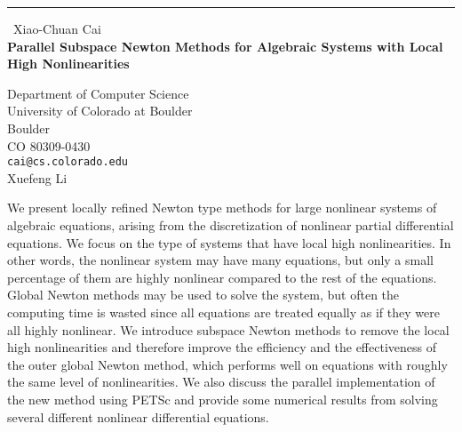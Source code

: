 \documentclass{report}
\begin{document}
\begin{center}
\rule{6in}{1pt} \
{\large Xiao-Chuan Cai \\
{\bf Parallel Subspace Newton Methods for Algebraic Systems with Local High Nonlinearities}}

Department of Computer Science \\ University of Colorado at Boulder \\ Boulder \\ CO 80309-0430
\\
{\tt cai@cs.colorado.edu}\\
Xuefeng Li\end{center}

We present locally refined Newton type methods for
large nonlinear systems of algebraic equations, arising from the
discretization of nonlinear partial differential equations. We focus on
the type of systems that have local high
nonlinearities. In other words, the nonlinear system may have many
equations, but only a small percentage of them are highly nonlinear
compared to the rest of the equations. Global Newton methods may be used
to solve the system, but often the computing time is wasted since all
equations are
treated equally as if they were all highly nonlinear. We introduce
subspace Newton methods to remove the local
high nonlinearities and therefore improve the efficiency and
the effectiveness of the outer global Newton method, which performs well
on equations with roughly the same level of nonlinearities. We also
discuss the parallel implementation of the new method using PETSc and
provide some numerical results from solving several different nonlinear
differential
equations.
\end{document}
